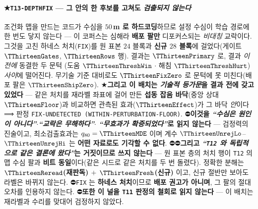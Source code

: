 \documentclass[11pt]{report}
\numberwithin{equation}{chapter}
\numberwithin{figure}{chapter}
\numberwithin{table}{chapter}
\begin{document}
\paragraph{★\texttt{T13-DEPTHFIX} --- 그 안의 한 후보를 고쳐도 \emph{검출되지 않는다}}
조건화 맵을 만드는 코드가 수심을 \textbf{$50$\,m 로 하드코딩}하므로 설정 수심이 학습
경로에 한 번도 닿지 않는다 --- 이 코퍼스는 심해라 \textbf{배포 팔만} 디포커스되는
\emph{비대칭} 교락이다. 그것을 고친 하네스 처치(\texttt{FIX})를 원 표본 $24$ 블록과
\textbf{신규 $28$ 블록}에 걸었다(게이트 $\TThirteenGates$, $\TThirteenRows$ 행).
결과는 \textbf{$\TThirteenPrimary$} 로, 결과 \emph{이전에} 동결한 두 문턱
(도움 $\TThirteenThreshWin$ $\cdot$ 해침 $\TThirteenThreshHurt$) \emph{사이}에 떨어진다.
무기술 기준 대비로도 $\TThirteenFixZero$ 로 문턱에 못 미친다(배포 팔은
$\TThirteenShipZero$).
★\textbf{그리고 이 배치는 \emph{기술적 등가문}을 결과 전에 갖고 있었다} --- 같은 처치를
재라벨 좌표에 걸어 만든 \textbf{섭동 잡음 바닥}(중앙 상대 $\TThirteenFloor$)과 비교하면
관측된 효과($\TThirteenEffect$)가 그 바닥 \emph{안}이다 ⟹ 판정
\texttt{FIX-UNDETECTED (WITHIN-PERTURBATION-FLOOR)}.
⛔\textbf{이것을 \emph{``수심은 원인이 아니다''}$\cdot$\emph{``교락은 무해하다''}$\cdot$
\emph{``무효과가 확증되었다''}로 읽지 않는다} --- 검정력의 진술이고, 최소검출효과는
$q_{80} = \TThirteenMDE$ 이며 계수 $\TThirteenUnrejLo$--$\TThirteenUnrejHi$ 는
\textbf{어떤 자료로도 기각할 수 없다}.
⛔⛔\textbf{그리고 \emph{``\texttt{T12} 와 \emph{독립적으로} 같은 결론에 왔다''}는
거짓이므로 쓰지 않는다} --- 원 표본 층의 처치 행이 \texttt{T12} 의 맵 수심 팔과
\textbf{비트 동일}이다(같은 시드로 같은 처치를 두 번 돌렸다). 정확한 분해는
\textbf{$\TThirteenReread$(재판독) $+$ $\TThirteenFresh$(신규)} 이고, 신규 절반만 보아도
라벨은 바뀌지 않는다.
⛔\texttt{FIX} 는 \textbf{하네스 처치}이므로 \textbf{배포 권고가 아니며}, 그 팔의 절대
오차를 인용하지 않는다. ⛔\textbf{또한 이 널을 \texttt{T11} 판정의 철회로 읽지 않는다}
--- 이 배치는 재라벨과 수리를 맞대어 검정하지 않았다.
\end{document}
